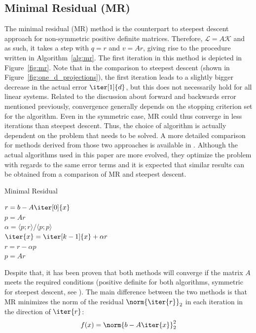 \subsection{Minimal Residual (MR)}
\label{sec:mr}
The minimal residual (MR) method is the counterpart to steepest descent approach for non-symmetric positive definite matrices. Therefore, $\mathcal{L}=A\mathcal{K}$ and as such, it takes a step with $q=r$ and $v=Ar$, giving rise to the procedure written in Algorithm~\hyperref[alg:mr]{\ref{alg:mr}}. The first iteration in this method is depicted in Figure~\hyperref[fig:mr]{\ref{fig:mr}}. Note that in the comparison to steepest descent (shown in Figure~\hyperref[fig:one_d_projections]{\ref{fig:one_d_projections}}), the first iteration leads to a slightly bigger decrease in the actual error $\iter[1]{d}$, but this does not necessarily hold for all linear systems. Related to the discussion about forward and backwards error mentioned previously, convergence generally depends on the stopping criterion set for the algorithm. Even in the symmetric case, MR could thus converge in less iterations than steepest descent. Thus, the choice of algorithm is actually dependent on the problem that needs to be solved. A more detailed comparison for methods derived from those two approaches is available in \cite{chin_cg_2012}. Although the actual algorithms used in this paper are more evolved, they optimize the problem with regards to the same error terms and it is expected that similar results can be obtained from a comparison of MR and steepest descent.
 

\begin{algorithm}[h]
  \caption{Minimal Residual}
  \label{alg:mr}
  \SetAlgoLined
  \DontPrintSemicolon
  $r = b-A\iter[0]{x}$ \\
  $p = Ar$ \\
   {
    $\alpha = \langle p;r \rangle / \langle p;p \rangle$ \\
    $\iter{x} = \iter[k-1]{x}+\alpha r$ \\
    $r = r - \alpha p$ \\
    $p = Ar$ \\
  }
\end{algorithm}

Despite that, it has been proven that both methods will converge if the matrix $A$ meets the required conditions (positive definite for both algorithms, symmetric for steepest descent, see \cite{saad_iterative_2003}). The main difference between the two methods is that MR minimizes the norm of the residual $\norm{\iter{r}}_2$ in each iteration in the direction of $\iter{r}$:
\begin{equation}
    f(x) = \norm{b-A\iter{x}}_2^2    
\end{equation}

